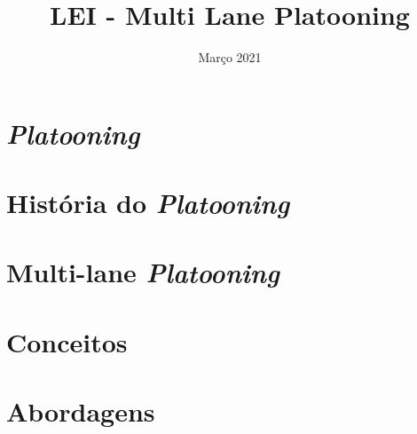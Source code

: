 \documentclass{article}
\title{LEI - Multi Lane Platooning}
\author{}
\date{Março 2021}
\begin{document}
\maketitle




\section{\textit{Platooning}}



\section{História do \textit{Platooning}}



\section{Multi-lane \textit{Platooning}}



\section{Conceitos}



\section{Abordagens}


\newpage

\end{document}
